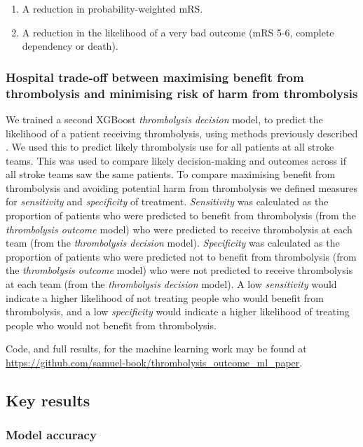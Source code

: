 \begin{enumerate}
    \item A reduction in probability-weighted mRS.
    \item A reduction in the likelihood of a very bad outcome (mRS 5-6, complete dependency or death).
\end{enumerate}

\subsubsection{Hospital trade-off between maximising benefit from thrombolysis and minimising risk of harm from thrombolysis}

We trained a second XGBoost \textit{thrombolysis decision} model, to predict the likelihood of a patient receiving thrombolysis, using methods previously described \cite{pearn_what_2023}. We used this to predict likely thrombolysis use for all patients at all stroke teams. This was used to compare likely decision-making and outcomes across if all stroke teams saw the same patients. To compare maximising benefit from thrombolysis and avoiding potential harm from thrombolysis we defined measures for \textit{sensitivity} and \textit{specificity} of treatment. \textit{Sensitivity} was calculated as the proportion of patients who were predicted to benefit from thrombolysis (from the \textit{thrombolysis outcome} model) who were predicted to receive thrombolysis at each team (from the \textit{thrombolysis decision} model). \textit{Specificity} was calculated as the proportion of patients who were predicted not to benefit from thrombolysis (from the \textit{thrombolysis outcome} model) who were not predicted to receive thrombolysis at each team (from the \textit{thrombolysis decision} model). A low \textit{sensitivity} would indicate a higher likelihood of not treating people who would benefit from thrombolysis, and a low \textit{specificity} would indicate a higher likelihood of treating people who would not benefit from thrombolysis.

Code, and full results, for the machine learning work may be found at \url{https://github.com/samuel-book/thrombolysis_outcome_ml_paper}.

\subsection{Key results}

\subsubsection{Model accuracy}

